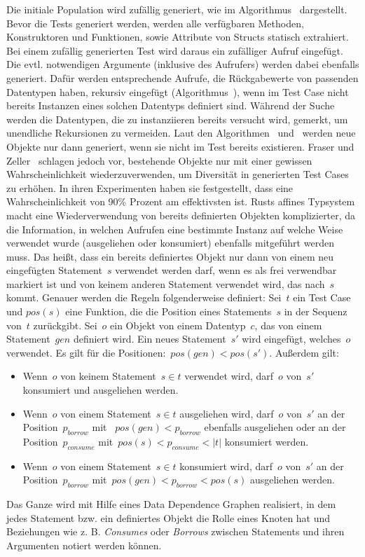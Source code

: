 \documentclass{article}
\begin{document}
Die initiale Population wird zufällig generiert, wie im Algorithmus~ dargestellt. Bevor die Tests generiert werden, werden alle verfügbaren Methoden, Konstruktoren und Funktionen, sowie Attribute von Structs statisch extrahiert. Bei einem zufällig generierten Test wird daraus ein zufälliger Aufruf eingefügt. Die evtl. notwendigen Argumente (inklusive des Aufrufers) werden dabei ebenfalls generiert. Dafür werden entsprechende Aufrufe, die Rückgabewerte von passenden Datentypen haben, rekursiv eingefügt (Algorithmus~), wenn im Test Case nicht bereits Instanzen eines solchen Datentyps definiert sind. Während der Suche werden die Datentypen, die zu instanziieren bereits versucht wird, gemerkt, um unendliche Rekursionen zu vermeiden. Laut den Algorithmen~ und~ werden neue Objekte nur dann generiert, wenn sie nicht im Test bereits existieren. Fraser und Zeller~\cite{Fraser2012} schlagen jedoch vor, bestehende Objekte nur mit einer gewissen Wahrscheinlichkeit wiederzuverwenden, um Diversität in generierten Test Cases zu erhöhen. In ihren Experimenten haben sie festgestellt, dass eine Wahrscheinlichkeit von 90\% Prozent am effektivsten ist. Rusts affines Typsystem macht eine Wiederverwendung von bereits definierten Objekten komplizierter, da die Information, in welchen Aufrufen eine bestimmte Instanz auf welche Weise verwendet wurde (ausgeliehen oder konsumiert) ebenfalls mitgeführt werden muss. Das heißt, dass ein bereits definiertes Objekt nur dann von einem neu eingefügten Statement~$s$ verwendet werden darf, wenn es als frei verwendbar markiert ist und von keinem anderen Statement verwendet wird, das nach~$s$ kommt. Genauer werden die Regeln folgenderweise definiert: Sei~$t$ ein Test Case und $pos(s)$ eine Funktion, die die Position eines Statements~$s$ in der Sequenz von~$t$ zurückgibt. Sei~$o$ ein Objekt von einem Datentyp~$c$, das von einem Statement~$gen$ definiert wird. Ein neues Statement~$s'$ wird eingefügt, welches~$o$ verwendet. Es gilt für die Positionen:~$pos(gen) < pos(s')$. Außerdem gilt:
\begin{itemize}
    \item Wenn~$o$ von keinem Statement~$s \in t$ verwendet wird, darf~$o$ von~$s'$ konsumiert und ausgeliehen werden. 
    \item Wenn~$o$ von einem Statement~$s \in t$ ausgeliehen wird, darf~$o$ von~$s'$ an der Position~$p_{borrow}$ mit ~$pos(gen) < p_{borrow}$ ebenfalls ausgeliehen oder an der Position~$p_{consume}$ mit~$pos(s) < p_{consume} < \left|t\right|$ konsumiert werden. 
    \item Wenn~$o$ von einem Statement~$s \in t$ konsumiert wird, darf~$o$ von~$s'$ an der Position~$p_{borrow}$ mit~$pos(gen) < p_{borrow} < pos(s)$ ausgeliehen werden. 
\end{itemize}
Das Ganze wird mit Hilfe eines Data Dependence Graphen realisiert, in dem jedes Statement bzw. ein definiertes Objekt die Rolle eines Knoten hat und Beziehungen wie z. B. \textit{Consumes} oder \textit{Borrows} zwischen Statements und ihren Argumenten notiert werden können. 
\end{document}
